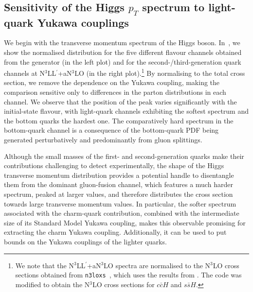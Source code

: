 \documentclass[11pt,a4paper]{article}
\begin{document}
\subsection{Sensitivity of the Higgs $p_T$ spectrum to light-quark Yukawa couplings}
We begin with the transverse momentum spectrum of the Higgs boson. In~, we show the normalised distribution for the five different flavour channels obtained from the \minnlo{} generator (in the left plot) and for the second-/third-generation quark channels at N$^3$LL$^{\prime}$+aN$^3$LO (in the right plot).\footnote{
We note that the N$^3$LL$^{\prime}$+aN$^3$LO spectra are normalised to the N$^3$LO cross sections obtained from \texttt{n3loxs}~\cite{Baglio:2022wzu}, which uses the results from . The code was modified to obtain the N$^3$LO cross sections for  $c\bar c H$ and  $s\bar s H$.}
By normalising to the total cross section, we remove the dependence on the Yukawa coupling, making the comparison sensitive only to differences in the parton distributions
in each channel. We observe that the position of the peak varies significantly with the initial-state flavour, with light-quark channels exhibiting the softest spectrum
and the bottom quarks the hardest one. The comparatively hard spectrum in the 
bottom-quark channel is a consequence of the bottom-quark PDF being 
generated perturbatively and predominantly from gluon splittings.

Although the small masses of the first- and second-generation quarks make their contributions challenging to detect experimentally, the shape of the Higgs transverse momentum distribution provides a potential handle to disentangle them from the dominant gluon-fusion channel, which features a much harder spectrum, peaked at larger values,
and therefore distributes the cross section towards large transverse momentum values.
In particular, the softer spectrum associated with the charm-quark contribution, combined with the intermediate size of its Standard Model Yukawa coupling, makes this observable promising for extracting the charm Yukawa coupling. Additionally, it can 
 be used to put bounds on the Yukawa couplings of the lighter quarks.
\end{document}
